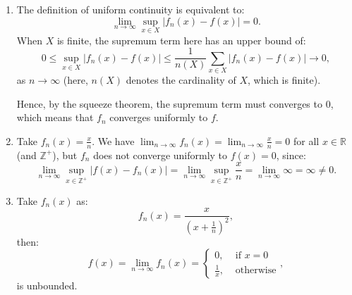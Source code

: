 \begin{enumerate}[label=\textbf{2E.\arabic*}]
  \item The definition of uniform continuity is equivalent to:
    \[
      \lim_{n \to \infty} \sup_{x \in X} |f_{n}(x)-f(x)| = 0
    .\] 
    When \( X \) is finite, the supremum term here has an upper bound of:
    \[
      0 \le \sup_{x \in X} |f_{n}(x) - f(x)| \le \frac{1}{n(X)} \sum_{x \in X}
      |f_{n}(x)-f(x)| \to 0
    ,\] as \( n \to \infty \) (here, \( n(X) \) denotes the cardinality of \( X \),
    which is finite).

    Hence, by the squeeze theorem, the supremum term must converges to \( 0 \),
    which means that \( f_{n} \) converges uniformly to \( f \).

  \item Take \( f_{n}(x) = \frac{x}{n} \). We have \( \lim_{n \to \infty}
    f_{n}(x) = \lim_{n \to \infty} \frac{x}{n} = 0 \) for all \( x \in
    \mathbb{R} \) (and \( \mathbb{Z}^{+} \)), but \( f_{n} \) does not converge
    uniformly to \( f(x) = 0 \), since:
    \[
      \lim_{n \to \infty} \sup_{x \in \mathbb{Z}^{+}} |f(x)-f_{n}(x)| = \lim_{n
      \to \infty} \sup_{x \in \mathbb{Z}^{+}} \frac{x}{n} = \lim_{n \to \infty}
      \infty = \infty \neq 0
    .\]
  \item 
    Take \( f_{n}(x) \) as:
    \[
      f_{n}(x) = \frac{x}{\left( x + \frac{1}{n} \right) ^2}
    ,\] then:
    \[
      f(x) = \lim_{n \to \infty} f_{n}(x) = \begin{cases}
        0, &\text{ if } x = 0\\
        \frac{1}{x}, & \text{ otherwise}
      \end{cases}
    ,\] is unbounded.


\end{enumerate}
